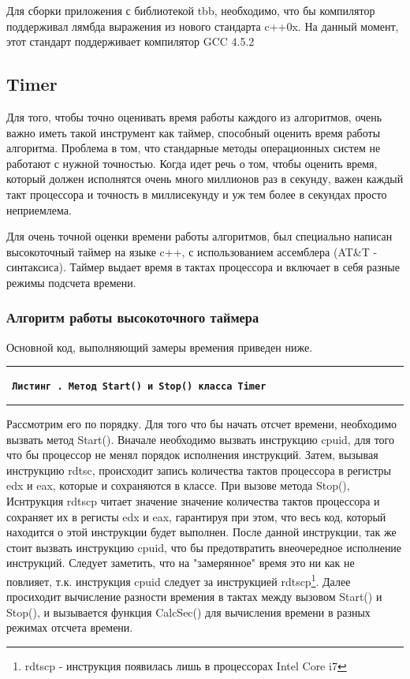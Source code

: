 \documentclass[12pt, a4paper]{article}
\newcommand{\HRule}{\noindent\rule{\linewidth}{0.45mm}}
\newcounter{sourcecode}
\newcommand*{\cppsource}[2]{\par{\HRule \small \tt \bf \noindent \ Листинг \arabic{sourcecode}. {\rm \small #2} \vspace{0.25cm}}%
\addtocounter{sourcecode}{1}  \HRule}
\begin{document}
Для сборки приложения с библиотекой tbb, необходимо, что бы компилятор поддерживал лямбда выражения из нового стандарта c++0x. На данный момент, этот стандарт поддерживает компилятор GCC 4.5.2

\subsection{Timer}
Для того, чтобы точно оценивать время работы каждого из алгоритмов, очень важно иметь такой инструмент как таймер, способный оценить время работы алгоритма. 
Проблема в том, что стандарные методы операционных систем не работают с нужной точностью. Когда идет речь о том, чтобы оценить время, который должен исполнятся очень много миллионов раз в секунду, важен каждый такт процессора и точность в миллисекунду и уж тем более в секундах просто неприемлема.

Для очень точной оценки времени работы алгоритмов, был специально написан высокоточный таймер на языке c++, с использованием ассемблера (AT\&T - синтаксиса).
Таймер выдает время в тактах процессора и включает в себя разные режимы подсчета времени.

\subsubsection{Алгоритм работы высокоточного таймера}
Основной код, выполняющий замеры времения приведен ниже.
\cppsource{src/timer.tex}{Метод Start() и Stop() класса Timer}

Рассмотрим его по порядку. Для того что бы начать отсчет времени, необходимо вызвать метод Start(). 
Вначале необходимо вызвать инструкцию cpuid, для того что бы процессор не менял порядок исполнения инструкций. Затем, вызывая инструкцию rdtsc, происходит запись количества тактов процессора в регистры edx и eax, которые и сохраняются в классе.
При вызове метода Stop(), 
Иснтрукция rdtscp читает значение значение количества тактов процессора и сохраняет их в регисты edx и eax, гарантируя при этом, что весь код, который находится о этой инструкции будет выполнен. После данной инструкции, так же стоит вызвать инструкцию cpuid, что бы предотвратить внеочередное исполнение инструкций.
Следует заметить, что на "замерянное" время это ни как не повлияет, т.к. инструкция cpuid следует за инструкцией rdtscp\footnote{rdtscp - инструкция появилась лишь в процессорах Intel Core i7}. Далее просиходит вычисление разности времения в тактах между вызовом Start() и Stop(), и вызывается функция CalcSec() для вычисления времени в разных режимах отсчета времени.
\end{document}
